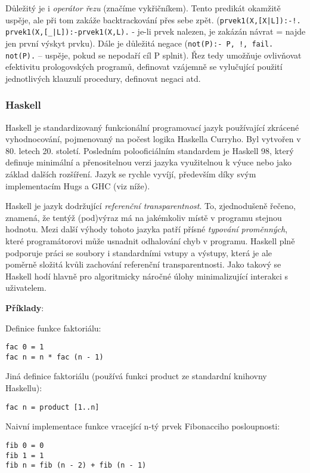 Důležitý je i \emph{operátor řezu} (značíme vykřičníkem). Tento predikát okamžitě uspěje, ale při tom zakáže backtrackování přes sebe zpět. (\texttt{prvek1(X,[X|L]):-!. prvek1(X,[\_|L]):-prvek1(X,L).} - je-li prvek nalezen, je zakázán návrat = najde jen první výskyt prvku). Dále je důležitá negace (\texttt{not(P):- P, !, fail. not(P).} -- uspěje, pokud se nepodaří cíl P splnit). Řez tedy umožňuje ovlivňovat efektivitu prologovských programů, definovat vzájemně se vylučující použití jednotlivých klauzulí procedury, definovat negaci atd.

\subsubsection*{Haskell}
Haskell je standardizovaný funkcionální programovací jazyk používající zkrácené vyhodnocování, pojmenovaný na počest logika Haskella Curryho. Byl vytvořen v 80. letech 20. století. Posledním polooficiálním standardem je Haskell 98, který definuje minimální a přenositelnou verzi jazyka využitelnou k výuce nebo jako základ dalších rozšíření. Jazyk se rychle vyvíjí, především díky svým implementacím Hugs a GHC (viz níže).

Haskell je jazyk dodržující \emph{referenční transparentnost}. To, zjednodušeně řečeno, znamená, že tentýž (pod)výraz má na jakémkoliv místě v programu stejnou hodnotu. Mezi další výhody tohoto jazyka patří přísné \emph{typování proměnných}, které programátorovi může usnadnit odhalování chyb v programu. Haskell plně podporuje práci se soubory i standardními vstupy a výstupy, která je ale poměrně složitá kvůli zachování referenční transparentnosti. Jako takový se Haskell hodí hlavně pro algoritmicky náročné úlohy minimalizující interakci s uživatelem.

\medskip\textbf{Příklady}:

Definice funkce faktoriálu:
\begin{verbatim}
fac 0 = 1
fac n = n * fac (n - 1)
\end{verbatim}

Jiná definice faktoriálu (používá funkci product ze standardní knihovny Haskellu):
\begin{verbatim}
fac n = product [1..n]
\end{verbatim}

Naivní implementace funkce vracející n-tý prvek Fibonacciho posloupnosti:
\begin{verbatim}
fib 0 = 0 
fib 1 = 1 
fib n = fib (n - 2) + fib (n - 1)
\end{verbatim}

